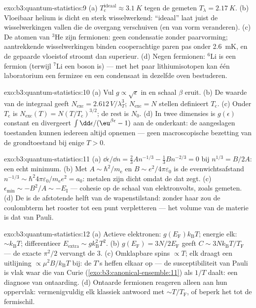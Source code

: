\begin{solution}{exo:b3:quantum-statistics:9}
(a) $T_{\text{c}}^{\text{ideaal}} \approx \qty{3.1}{K}$ tegen de gemeten
$T_\lambda = \qty{2.17}{K}$. (b) Vloeibaar helium is dicht en sterk
wisselwerkend: ``ideaal'' laat juist de wisselwerkingen vallen die de
overgang verschuiven (en van vorm veranderen). (c) De atomen van $^3$He
zijn fermionen: geen condensatie zonder paarvorming; aantrekkende
wisselwerkingen binden cooperachtige paren pas onder \qty{2.6}{mK}, en de
gepaarde vloeistof stroomt dan superieur. (d) Negen fermionen: $^6$Li is
een fermion (terwijl $^7$Li een boson is) --- met het paar lithiumisotopen
kan één laboratorium een fermizee en een condensaat in dezelfde oven
bestuderen.
\end{solution}

\begin{solution}{exo:b3:quantum-statistics:10}
(a) Vul $g \propto \sqrt\epsilon$ in en schaal $\beta$ eruit. (b) De
waarde van de integraal geeft $N_{\text{exc}} =
2.612\,V/\lambda_T^3$;
$N_{\text{exc}} = N$ stellen definieert $T_{\text{c}}$. (c) Onder
$T_{\text{c}}$ is $N_{\text{exc}}(T) =
N(T/T_{\text{c}})^{3/2}$; de rest
is $N_0$. (d) In twee dimensies is $g(\epsilon)$ constant en divergeert
$\int\dd\epsilon/(\eu^{
\beta\epsilon} - 1)$ aan de onderkant: de
aangeslagen toestanden kunnen iedereen altijd opnemen --- geen
macroscopische bezetting van de grondtoestand bij enige $T > 0$.
\end{solution}

\begin{solution}{exo:b3:quantum-statistics:11}
(a) $\dd\epsilon/\dd n = \tfrac23 An^{-1/3} - \tfrac13 Bn^{-2/3} =
0$ bij $n^{1/3} = B/2A$: een echt minimum. (b) Met $A \sim
\hbar^2/m_{\text{e}}$ en $B \sim e^2/4\pi\varepsilon_0$ is de
evenwichtsafstand $n^{-1/3} \sim \hbar^2 4\pi\varepsilon_0/
m_{\text{e}}e^2 = a_0$: metalen zijn dicht omdat de  dat zegt.
(c) $\epsilon_{\min} \sim -B^2/A \sim -E_{\text{I}}$ --- cohesie op de
schaal van elektronvolts, zoals gemeten. (d) De  is de
afstotende helft van de wapenstilstand: zonder haar zou de coulombterm
het rooster tot een punt verpletteren --- het volume van de materie is
dat van Pauli.
\end{solution}

\begin{solution}{exo:b3:quantum-statistics:12}
(a) Actieve elektronen: $g(E_{\text{F}})k_{\text{B}}T$; energie elk: $\sim k_{\text{B}}T$; differentieer $E_{\text{extra}} \sim
g k_{\text{B}}^2T^2$. (b) $g(E_{\text{F}}) = 3N/2E_{\text{F}}$ geeft $C \sim 3Nk_{\text{B}}T/T_{\text{F}}$ --- de exacte $\pi^2/2$ vervangt de 3.
(c) Omklapbare spins $\propto T$; elk draagt een uitlijning $\propto \mu^2B/k_{\text{B}}T$ bij: de $T$'s heffen elkaar op --- de
susceptibiliteit van Pauli is vlak waar die van Curie
(\cref{exo:b3:canonical-ensemble:11}) als $1/T$ daalt: een diagnose van
ontaarding. (d) Ontaarde fermionen reageren alleen aan hun oppervlak:
vermenigvuldig elk klassiek antwoord met $\sim
T/T_{\text{F}}$, of beperk
het tot de fermischil.
\end{solution}

